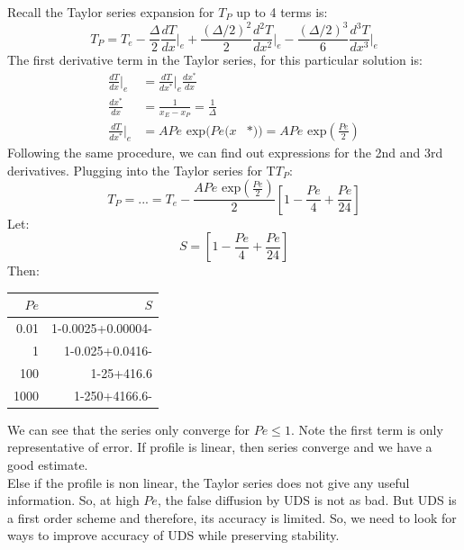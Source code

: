 \documentclass[11pt]{article}
\begin{document}
Recall the Taylor series expansion for \(T_P\) up to 4 terms is:
\begin{equation*}
T_P = T_e - \frac{\Delta}{2}\frac{dT}{dx}\biggr \rvert_e + \frac{(\Delta / 2)^2}{2}\frac{d^2T}{dx^2}\biggr \rvert_e -
\frac{(\Delta / 2)^3}{6}\frac{d^3T}{dx^3}\biggr \rvert_e 
\end{equation*}
The first derivative term in the Taylor series, for this particular solution is:
\begin{equation*}
\begin{aligned}
\frac{dT}{dx}\biggr\rvert_e &= \frac{dT}{dx^*}\biggr\rvert_e \frac{dx^*}{dx}\\
\frac{dx^*}{dx} &= \frac{1}{x_E-x_P} = \frac{1}{\Delta}\\
\frac{dT}{dx^*}\biggr \rvert_e &= APe\textrm{ exp}(Pe (x&*)) = APe\textrm{ exp}\left(\frac{Pe}{2}\right)
\end{aligned}
\end{equation*}
Following the same procedure, we can find out expressions for the 2nd and 3rd derivatives. Plugging into the Taylor series for T\(T_P\):
\begin{equation*}
T_P = ... = T_e - \frac{APe \textrm{ exp} \left(\frac{Pe}{2}\right)} {2} \left[1 - \frac{Pe}{4} + \frac{Pe}{24} \right]
\end{equation*}
Let:
\begin{equation*}
S = \left[1 - \frac{Pe}{4} + \frac{Pe}{24} \right]
\end{equation*}
Then:
\begin{center}
\begin{tabular}{rr}
\(Pe\) & \(S\)\\
\hline
0.01 & 1-0.0025+0.00004-\\
1 & 1-0.025+0.0416-\\
100 & 1-25+416.6\\
1000 & 1-250+4166.6-\\
\end{tabular}
\end{center}

We can see that the series only converge for \(Pe \leq 1\). Note the first term is only representative of error.
If profile is linear, then series converge and we have a good estimate.\\
Else if the profile is non linear, the Taylor series does not give any useful information. So, at high \(Pe\), the false
diffusion by UDS is not as bad. But UDS is a first order scheme and therefore, its accuracy is limited. So, we need
to look for ways to improve accuracy of UDS while preserving stability. 
\end{document}
